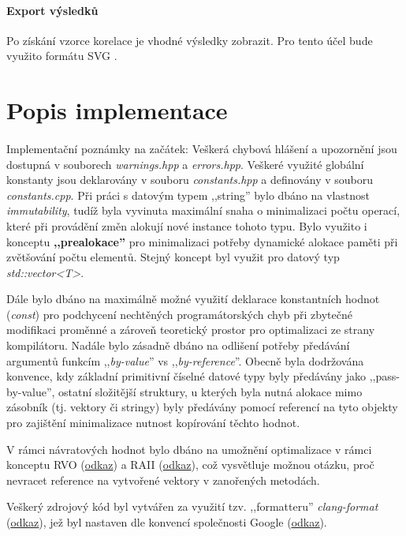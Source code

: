 \documentclass[12pt, a4paper]{article}
\begin{document}
\paragraph{Export výsledků} Po získání vzorce korelace je vhodné výsledky zobrazit. 
Pro tento účel bude využito formátu SVG \cite{SVG}.

\section{Popis implementace}
\paragraph{} Implementační poznámky na začátek: Veškerá chybová hlášení a upozornění jsou dostupná v souborech \textit{warnings.hpp} a \textit{errors.hpp}.
Veškeré využité globální konstanty jsou deklarovány v souboru \textit{constants.hpp} a definovány v souboru \textit{constants.cpp}.
Při práci s datovým typem ,,string'' bylo dbáno na vlastnost \textit{immutability}, tudíž byla vyvinuta maximální snaha o minimalizaci počtu operací, které při provádění změn alokují nové instance tohoto typu.
Bylo využito i konceptu \textbf{,,prealokace''} pro minimalizaci potřeby dynamické alokace paměti při zvětšování počtu elementů. 
Stejný koncept byl využit pro datový typ \textit{std::vector<T>}.

Dále bylo dbáno na maximálně možné využití deklarace konstantních hodnot (\textit{const}) pro podchycení nechtěných programátorských chyb při zbytečné modifikaci proměnné a zároveň teoretický prostor pro optimalizaci ze strany kompilátoru.
Nadále bylo zásadně dbáno na odlišení potřeby předávání argumentů funkcím ,,\textit{by-value}'' vs ,,\textit{by-reference}''.
Obecně byla dodržována konvence, kdy základní primitivní číselné datové typy byly předávány jako ,,pass-by-value'', ostatní složitější struktury, u kterých byla nutná alokace mimo zásobník (tj. vektory či stringy) byly předávány pomocí referencí na tyto objekty pro zajištění minimalizace nutnost kopírování těchto hodnot. 

V rámci návratových hodnot bylo dbáno na umožnění optimalizace v rámci konceptu RVO (\href{https://en.wikipedia.org/wiki/Copy_elision}{odkaz}) a RAII (\href{https://en.wikipedia.org/wiki/Resource_acquisition_is_initialization}{odkaz}), což vysvětluje možnou otázku, proč nevracet reference na vytvořené vektory v zanořených metodách.

Veškerý zdrojový kód byl vytvářen za využití tzv. ,,formatteru'' \textit{clang-format} (\href{https://clang.llvm.org/docs/ClangFormat.html}{\underline{odkaz}}), jež byl nastaven dle konvencí společnosti Google (\href{https://github.com/kehanXue/google-style-clang-format?tab=readme-ov-file}{\underline{odkaz}}).
\end{document}
